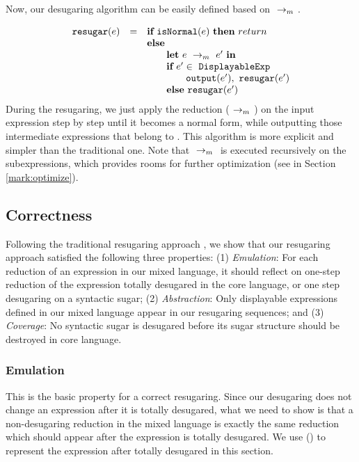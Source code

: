 
Now, our desugaring algorithm can be easily defined based on $~\rightarrow_m~$.

\[
\begin{array}{llll}
\mbox{\tt resugar} (e) &=& \mbox{\rm \bf if}~\mbox{\tt isNormal}(e)~\mbox{\rm \bf then}~return\\
              & & \mbox{\rm \bf else}~\\
							& & \qquad \mbox{\rm \bf let}~e ~\rightarrow_m~e'~\mbox{\rm \bf in}\\
							& & \qquad \mbox{\rm \bf if}~e' \in~\mbox{\tt DisplayableExp} \\
							& & \qquad \qquad \mbox{\tt output}(e'),~\mbox{\tt resugar}(e')\\
							& & \qquad \mbox{\rm \bf else}~\mbox{\tt resugar}(e')
\end{array}
\]
During the resugaring, we just apply the reduction ($~\rightarrow_m~$) on the input expression step by step until it becomes a normal form, while outputting those intermediate expressions that belong to . This algorithm is more explicit and simpler than the traditional one. Note that $~\rightarrow_m~$ is executed recursively on the subexpressions, which provides rooms for further optimization (see in Section \ref{mark:optimize}).

\subsection{Correctness}
\label{mark:correct}

Following the traditional resugaring approach \cite{resugaring,hygienic}, we show that our resugaring approach satisfied the following three properties:
(1)
\emph{Emulation}: For each reduction of an expression in our mixed language, it should reflect on one-step reduction of the expression totally desugared in the core language, or one step desugaring on a syntactic sugar;
(2)
\emph{Abstraction}: Only displayable expressions defined in our mixed language appear in our resugaring sequences; and
(3)
\emph{Coverage}: No syntactic sugar is desugared before its sugar structure should be destroyed in core language.

\subsubsection{Emulation} This is the basic property for a correct resugaring. Since our desugaring does not change an expression after it is totally desugared, what we need to show is that a non-desugaring reduction in the mixed language is exactly the same  reduction which should appear after the expression is totally desugared. We use () to represent the expression after  totally desugared in this section.

